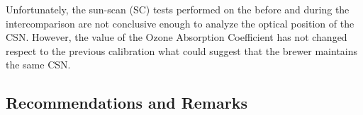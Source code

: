 Unfortunately, the sun-scan (SC) tests performed on the before and during the intercomparison are not conclusive enough to analyze the optical position of the CSN. However, the value of the Ozone Absorption Coefficient has not changed respect to the previous calibration what could suggest that the brewer maintains the same CSN.   








\subsection{Recommendations and Remarks} \label{subsec:RR}



